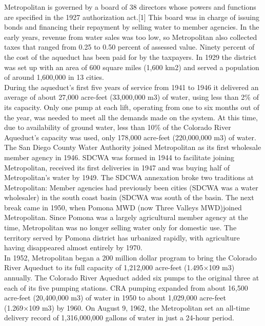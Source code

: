 \documentclass{article}
\begin{document}
Metropolitan is governed by a board of 38 directors whose powers and functions are specified in the 1927 authorization act.[1] This board was in charge of issuing bonds and financing their repayment by selling water to member agencies. In the early years, revenue from water sales was too low, so Metropolitan also collected taxes that ranged from 0.25 to 0.50 percent of assessed value. Ninety percent of the cost of the aqueduct has been paid for by the taxpayers. In 1929 the district was set up with an area of 600 square miles (1,600 km2) and served a population of around 1,600,000 in 13 cities.\\

During the aqueduct's first five years of service from 1941 to 1946 it delivered an average of about 27,000 acre-feet (33,000,000 m3) of water, using less than 2\% of its capacity. Only one pump at each lift, operating from one to six months out of the year, was needed to meet all the demands made on the system. At this time, due to availability of ground water, less than 10\% of the Colorado River Aqueduct's capacity was used, only 178,000 acre-feet (220,000,000 m3) of water.\\

The San Diego County Water Authority joined Metropolitan as its first wholesale member agency in 1946. SDCWA was formed in 1944 to facilitate joining Metropolitan, received its first deliveries in 1947 and was buying half of Metropolitan's water by 1949. The SDCWA annexation broke two traditions at Metropolitan: Member agencies had previously been cities (SDCWA was a water wholesaler) in the south coast basin (SDCWA was south of the basin. 
The next break came in 1950, when Pomona MWD (now Three Valleys MWD)joined Metropolitan. Since Pomona was a largely agricultural member agency at the time, Metropolitan was no longer selling water only for domestic use.
The territory served by Pomona district has urbanized rapidly, with agriculture having disappeared almost entirely by 1970.\\

In 1952, Metropolitan began a 200 million dollar program to bring the Colorado River Aqueduct to its full capacity of 1,212,000 acre-feet (1.495×109 m3) annually. The Colorado River Aqueduct added six pumps to the original three at each of its five pumping stations. CRA pumping expanded from about 16,500 acre-feet (20,400,000 m3) of water in 1950 to about 1,029,000 acre-feet (1.269×109 m3) by 1960. On August 9, 1962, the Metropolitan set an all-time delivery record of 1,316,000,000 gallons of water in just a 24-hour period.\\
\end{document}
